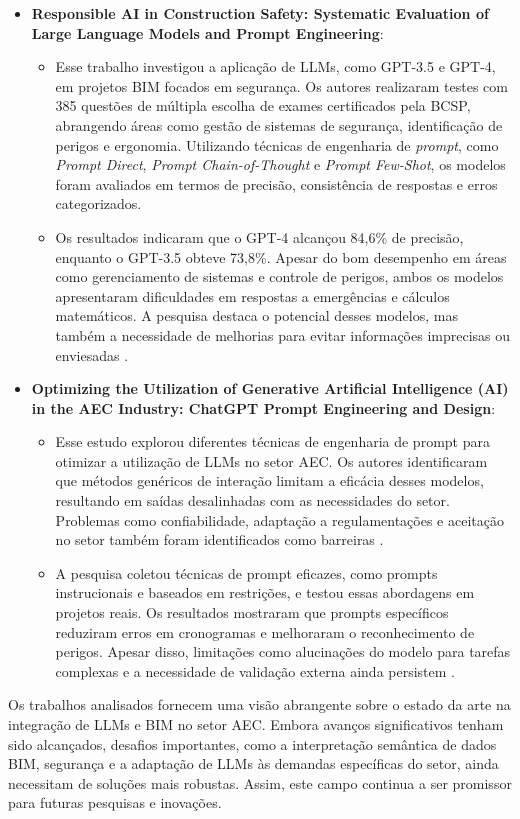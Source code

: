 \begin{itemize}
    \item \textbf {Responsible AI in Construction Safety: Systematic Evaluation of Large Language Models and Prompt Engineering}: 
    \begin{itemize}
        \item   Esse trabalho investigou a aplicação de LLMs, como GPT-3.5 e GPT-4, em projetos BIM focados em segurança. Os autores realizaram testes com 385 questões de múltipla escolha de exames certificados pela BCSP, abrangendo áreas como gestão de sistemas de segurança, identificação de perigos e ergonomia. Utilizando técnicas de engenharia de \textit{prompt}, como \textit{Prompt Direct}, \textit{Prompt Chain-of-Thought} e \textit{Prompt Few-Shot}, os modelos foram avaliados em termos de precisão, consistência de respostas e erros categorizados. 
        \item   Os resultados indicaram que o GPT-4 alcançou 84,6\% de precisão, enquanto o GPT-3.5 obteve 73,8\%. Apesar do bom desempenho em áreas como gerenciamento de sistemas e controle de perigos, ambos os modelos apresentaram dificuldades em respostas a emergências e cálculos matemáticos. A pesquisa destaca o potencial desses modelos, mas também a necessidade de melhorias para evitar informações imprecisas ou enviesadas \cite{sammou2024}.
    \end{itemize}

    \item \textbf {Optimizing the Utilization of Generative Artificial Intelligence (AI) in the AEC Industry: ChatGPT Prompt Engineering and Design}:
    \begin{itemize}
        \item   Esse estudo explorou diferentes técnicas de engenharia de prompt para otimizar a utilização de LLMs no setor AEC. Os autores identificaram que métodos genéricos de interação limitam a eficácia desses modelos, resultando em saídas desalinhadas com as necessidades do setor. Problemas como confiabilidade, adaptação a regulamentações e aceitação no setor também foram identificados como barreiras \cite{samsami2024}. 
        \item   A pesquisa coletou técnicas de prompt eficazes, como prompts instrucionais e baseados em restrições, e testou essas abordagens em projetos reais. Os resultados mostraram que prompts específicos reduziram erros em cronogramas e melhoraram o reconhecimento de perigos. Apesar disso, limitações como alucinações do modelo para tarefas complexas e a necessidade de validação externa ainda persistem \cite{samsami2024}.
    \end{itemize}
\end{itemize}

Os trabalhos analisados fornecem uma visão abrangente sobre o estado da arte na integração de LLMs e BIM no setor AEC. Embora avanços significativos tenham sido alcançados, desafios importantes, como a interpretação semântica de dados BIM, segurança e a adaptação de LLMs às demandas específicas do setor, ainda necessitam de soluções mais robustas. Assim, este campo continua a ser promissor para futuras pesquisas e inovações.